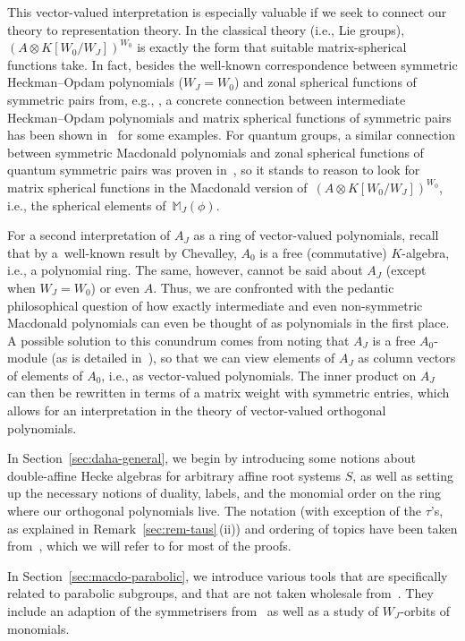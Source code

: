 \documentclass[pdftex]{sigma}
\theoremstyle{definition}
\numberwithin{equation}{section}
\begin{document}
This vector-valued interpretation is especially valuable if we seek
to connect our theory to representation theory. In the classical theory
(i.e., Lie groups),
$(A\otimes K[W_0/W_J])^{W_0}$ is exactly the form that suitable
matrix-spherical functions take. In fact, besides the well-known
correspondence between symmetric Heckman--Opdam polynomials ($W_J=W_0$)
and zonal spherical functions of symmetric pairs from, e.g., \cite{heckmanSchlichtkrull}, a concrete connection between intermediate
Heckman--Opdam polynomials and matrix spherical functions of symmetric
pairs has been shown in~\cite{mvpBC1,mvpVectorValued} for some examples.
For quantum groups, a similar connection between symmetric Macdonald polynomials
and zonal spherical functions of quantum symmetric pairs was proven
in~\cite{letzter}, so it stands to reason to look for matrix spherical
functions in the Macdonald version of~${(A\otimes K[W_0/W_J])^{W_0}}$, i.e., the spherical elements of~${\mathbb{M}_J(\phi)}$.

For a second interpretation of $A_J$ as a ring of vector-valued
polynomials, recall that by a~well-known result by Chevalley,
$A_0$ is a free (commutative) $K$-algebra,
i.e., a polynomial ring. The same, however, cannot be said about $A_J$
(except when $W_J=W_0$) or even $A$. Thus, we are confronted with the
pedantic philosophical question of how exactly intermediate and even non-symmetric
Macdonald polynomials can even be thought of as polynomials in
the first place. A possible solution to this conundrum comes from noting
that $A_J$ is a free $A_0$-module (as is detailed in~\cite{pittieSteinberg}), so that we
can view elements of $A_J$ as column vectors of elements of $A_0$, i.e.,
as vector-valued polynomials. The inner product on $A_J$ can then be
rewritten in terms of a matrix weight with symmetric entries, which
allows for an interpretation in the theory of vector-valued orthogonal
polynomials.

In Section~\ref{sec:daha-general}, we begin by introducing some notions about double-affine Hecke algebras for arbitrary
affine root systems $S$, as well as setting up the necessary notions of duality, labels, and
the monomial order on the ring where our orthogonal polynomials live. The notation (with
exception of the $\tau$'s, as explained in Remark~\ref{sec:rem-taus}\,(ii)) and
ordering of topics have been taken from~\cite{macdonald}, which we will refer to for most of the proofs.

In Section~\ref{sec:macdo-parabolic}, we introduce various tools that are specifically related to parabolic subgroups,
and that are not taken wholesale from~\cite{macdonald}. They include an adaption of the symmetrisers from~\cite[Section~5.5]{macdonald} as well as a study of $W_J$-orbits of monomials.
\end{document}
